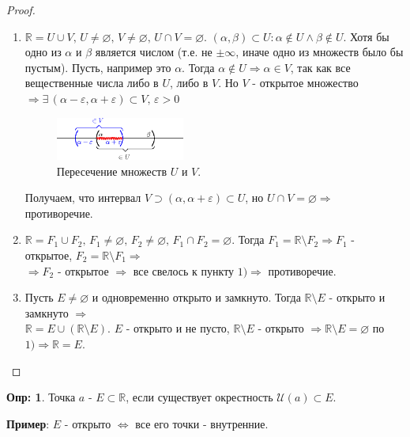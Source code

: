 \documentclass[12pt]{article}
\theoremstyle{definition}
\newtheorem{defn}{Опр:}
\begin{document}
\begin{proof}\hfill
	\begin{enumerate}[label={\arabic*)}]
		\item $\mathbb{R} = U \cup V, \, U \neq \varnothing, \, V \neq \varnothing, \, U \cap V = \varnothing$. $(\alpha, \beta )\subset U \colon \alpha \notin U \wedge \beta \notin U$. Хотя бы одно из $\alpha$ и $\beta$ является числом (т.е. не $\pm \infty$, иначе одно из множеств было бы пустым). Пусть, например это $\alpha$. Тогда $\alpha \notin U \Rightarrow \alpha \in V$, так как все вещественные числа либо в $U$, либо в $V$. Но $V$ - открытое множество $\Rightarrow \exists \, (\alpha - \varepsilon , \alpha + \varepsilon) \subset V, \, \varepsilon > 0$
		\begin{figure}[H]
			\centering
			\includegraphics[width=0.4\textwidth]{12_1.eps}
			\caption{Пересечение множеств $U$ и $V$.}
			\label{12_1}
		\end{figure}
		Получаем, что интервал $V \supset (\alpha, \alpha + \varepsilon) \subset U$, но $U \cap V = \varnothing \Rightarrow$ противоречие.
		\item $\mathbb{R} = F_1 \cup F_2, \, F_1 \neq \varnothing, \, F_2 \neq \varnothing, \, F_1 \cap F_2 = \varnothing$. Тогда $F_1 = \mathbb{R} \setminus F_2 \Rightarrow F_1$ - открытое, $F_2 = \mathbb{R} \setminus F_1 \Rightarrow$ \\ $\Rightarrow F_2$ - открытое $\Rightarrow$ все свелось к пункту $1) \Rightarrow$ противоречие.
		\item Пусть $E \neq \varnothing$ и одновременно открыто и замкнуто. Тогда $\mathbb{R} \setminus E$ - открыто и замкнуто $\Rightarrow$ \\
		$\mathbb{R} = E \cup (\mathbb{R} \setminus E)$. $E$ - открыто и не пусто, $\mathbb{R} \setminus E$ - открыто $\Rightarrow \mathbb{R} \setminus E = \varnothing$ по $1) \Rightarrow \mathbb{R} = E$.
	\end{enumerate}
\end{proof}
	
\begin{defn}
	Точка $a$ -  $E \subset \mathbb{R}$, если существует окрестность $\mathcal{U}(a) \subset E$.
\end{defn}

\textbf{Пример}: $E$ - открыто $\Leftrightarrow$ все его точки - внутренние.
	
\end{document}
